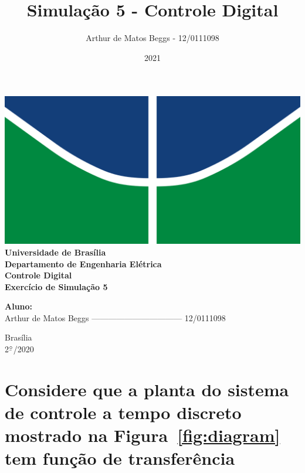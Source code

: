 \documentclass{article}
\title{Simulação 5 - Controle Digital}
\author{Arthur de Matos Beggs - 12/0111098}
\date{2021}
\newcommand{\ubar}[1]{\underaccent{\bar}{#1}}
\begin{document}
\begin{titlepage}
    \begin{center}
        \centering
        \includegraphics[width=.7\linewidth]{images/logo_unb.png}\\[0.5cm]
        {\large \textbf{Universidade de Brasília}}\\[0.2cm]
        {\large \textbf{Departamento de Engenharia Elétrica}}\\[0.2cm]
        {\large \textbf{Controle Digital}}\\[4.8cm]
        {\bf \huge {Exercício de Simulação 5}}\\[0.2cm]
        {\bf \large {}}
    \end{center}

    \vspace{5cm}
    \hspace{2cm} {\noindent \bf \large {Aluno:}}\\
    \vspace{0.8cm}
    \hspace{2.35cm} {\large Arthur de Matos Beggs --------------------------------- 12/0111098}\\[1cm]

    \begin{center}
        {\large Brasília}\\
        {\large 2$^{\ubar{\circ}}$/2020}
    \end{center}

\end{titlepage}

\clearpage %

\setcounter{page}{2}

    \section*{\normalsize{\normalfont Considere que a planta do sistema de
    controle a tempo discreto mostrado na Figura~\ref{fig:diagram} tem função
    de transferência}}
\end{document}
